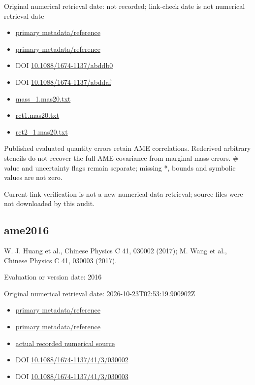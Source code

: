 \documentclass[
  11pt,
  letterpaper,
]{article}
\providecommand{\tightlist}{%
  \setlength{\itemsep}{0pt}\setlength{\parskip}{0pt}}
\begin{document}
Original numerical retrieval date: not recorded; link-check date is not
numerical retrieval date

\begin{itemize}
\tightlist
\item
  \href{https://www-nds.iaea.org/amdc/}{primary metadata/reference}
\item
  \href{https://cpc.ihep.ac.cn/article/doi/10.1088/1674-1137/abddaf}{primary
  metadata/reference}
\item
  DOI
  \href{https://doi.org/10.1088/1674-1137/abddb0}{10.1088/1674-1137/abddb0}
\item
  DOI
  \href{https://doi.org/10.1088/1674-1137/abddaf}{10.1088/1674-1137/abddaf}
\item
  \href{https://www-nds.iaea.org/amdc/ame2020/mass_1.mas20.txt}{mass\_1.mas20.txt}
\item
  \href{https://www-nds.iaea.org/amdc/ame2020/rct1.mas20.txt}{rct1.mas20.txt}
\item
  \href{https://www-nds.iaea.org/amdc/ame2020/rct2_1.mas20.txt}{rct2\_1.mas20.txt}
\end{itemize}

Published evaluated quantity errors retain AME correlations. Rederived
arbitrary stencils do not recover the full AME covariance from marginal
mass errors. \# value and uncertainty flags remain separate; missing *,
bounds and symbolic values are not zero.

Current link verification is not a new numerical-data retrieval; source
files were not downloaded by this audit.

\subsection{ame2016}\label{ame2016}

W. J. Huang et al., Chinese Physics C 41, 030002 (2017); M. Wang et al.,
Chinese Physics C 41, 030003 (2017).

Evaluation or version date: 2016

Original numerical retrieval date: 2026-10-23T02:53:19.900902Z

\begin{itemize}
\tightlist
\item
  \href{https://cpc.ihep.ac.cn/article/doi/10.1088/1674-1137/41/3/030002}{primary
  metadata/reference}
\item
  \href{https://cpc.ihep.ac.cn/article/doi/10.1088/1674-1137/41/3/030003}{primary
  metadata/reference}
\item
  \href{https://www-nds.iaea.org/amdc/ame2016/mass16.txt}{actual
  recorded numerical source}
\item
  DOI
  \href{https://doi.org/10.1088/1674-1137/41/3/030002}{10.1088/1674-1137/41/3/030002}
\item
  DOI
  \href{https://doi.org/10.1088/1674-1137/41/3/030003}{10.1088/1674-1137/41/3/030003}
\end{itemize}
\end{document}
